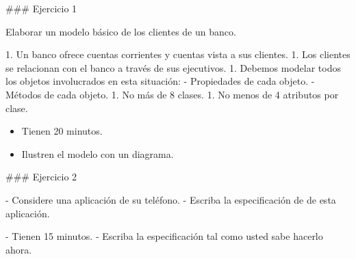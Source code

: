 \begin{columns}[t,onlytextwidth]
{
\centering{}
}

{
    \vspace{-33mm}
\centering{}
}
\end{columns}


### Ejercicio 1

Elaborar un modelo básico de los clientes de un banco.

1. Un banco ofrece cuentas corrientes y cuentas vista a sus clientes.
1. Los clientes se relacionan con el banco a través de sus ejecutivos.
1. Debemos modelar todos los objetos involucrados en esta situación:
    - Propiedades de cada objeto.
    - Métodos de cada objeto.
1. No más de 8 clases.
1. No menos de 4 atributos por clase.
\vfill


\begin{center}\begin{customRoundedBox}{}%
\begin{itemize}
  \item Tienen 20 minutos.
  \item Ilustren el modelo con un diagrama.
\end{itemize}
\end{customRoundedBox}
\end{center}


### Ejercicio 2

- Considere una aplicación de su teléfono.
- Escriba la especificación de  de esta aplicación.


\importantboxbegin

- Tienen 15 minutos.
- Escriba la especificación tal como usted sabe hacerlo ahora.

